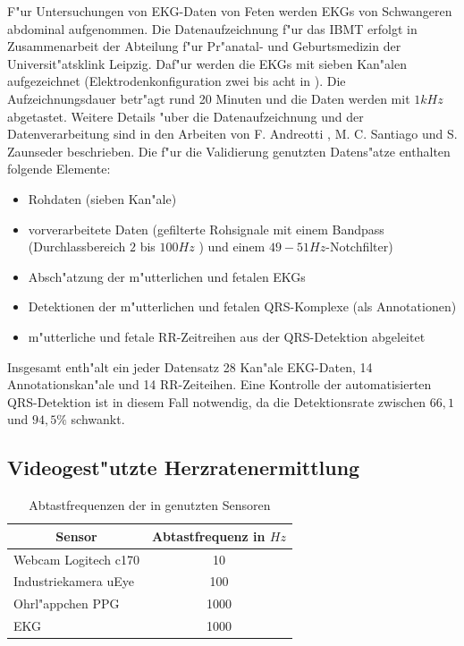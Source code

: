 F"ur Untersuchungen von \ac{EKG}-Daten von Feten werden \acp{EKG} von Schwangeren abdominal aufgenommen.
Die Datenaufzeichnung f"ur das \ac{IBMT} erfolgt in Zusammenarbeit der Abteilung f"ur Pr"anatal- und Geburtsmedizin der Universit"atsklink Leipzig.
Daf"ur werden die \acp{EKG} mit sieben Kan"alen aufgezeichnet (Elektrodenkonfiguration zwei bis acht in ).
Die Aufzeichnungsdauer betr"agt rund 20 Minuten und die Daten werden mit $1{}kHz$ abgetastet.
Weitere Details "uber die Datenaufzeichnung und der Datenverarbeitung sind in den Arbeiten von F. Andreotti \cite{Andreotti2011}, M. C. Santiago \cite{Santiago2012} und S. Zaunseder \cite{Zaunseder2012} beschrieben.
Die f"ur die Validierung genutzten Datens"atze enthalten folgende Elemente:
\begin{itemize}
	\item Rohdaten (sieben Kan"ale)
	\item vorverarbeitete Daten (gefilterte Rohsignale mit einem Bandpass (Durchlassbereich $2$ bis $100{}Hz$ \cite{Andreotti2011}) und einem $49-51{}Hz$-Notchfilter)
	\item Absch"atzung der m"utterlichen und fetalen \acp{EKG}
	\item Detektionen der m"utterlichen und fetalen QRS-Komplexe (als Annotationen)
	\item m"utterliche und fetale RR-Zeitreihen aus der QRS-Detektion abgeleitet
\end{itemize}
Insgesamt enth"alt ein jeder Datensatz 28 Kan"ale \ac{EKG}-Daten, 14 Annotationskan"ale und 14 RR-Zeiteihen.
Eine Kontrolle der automatisierten QRS-Detektion ist in diesem Fall notwendig, da die Detektionsrate zwischen $66,1$ und $94,5{}\%$ \cite{Zaunseder2012} schwankt.



\subsection{Videogest"utzte Herzratenermittlung}

\begin{table}[bht]
\centering
\begin{tabular}{l|c}
	\hline
	\multicolumn{1}{|c|}{Sensor} & \multicolumn{1}{|c|}{Abtastfrequenz in $Hz$} \\\hline
	Webcam Logitech c170 & 10 \\
	Industriekamera uEye & 100 \\
	Ohrl"appchen \ac{PPG} & 1000 \\
	\ac{EKG} & 1000 \\
\end{tabular}
\caption{Abtastfrequenzen der in \cite{Zhai2012} genutzten Sensoren}
\label{tab:zhai_frequenzen}
\end{table}

